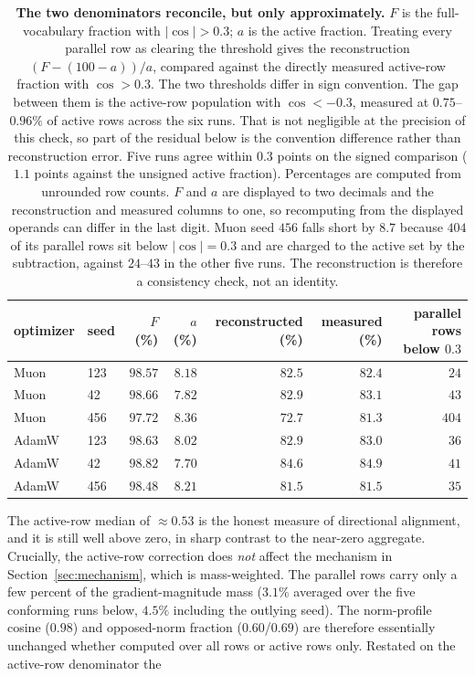 \begin{table}[t]
\centering
\small
\begin{tabular}{llrrrrr}
\toprule
optimizer & seed & $F$ (\%) & $a$ (\%) & reconstructed (\%) & measured (\%) & parallel rows below $0.3$ \\
\midrule
Muon & 123 & $98.57$ & $8.18$ & $82.5$ & $82.4$ & $24$ \\
Muon & 42 & $98.66$ & $7.82$ & $82.9$ & $83.1$ & $43$ \\
Muon & 456 & $97.72$ & $8.36$ & $72.7$ & $81.3$ & $404$ \\
AdamW & 123 & $98.63$ & $8.02$ & $82.9$ & $83.0$ & $36$ \\
AdamW & 42 & $98.82$ & $7.70$ & $84.6$ & $84.9$ & $41$ \\
AdamW & 456 & $98.48$ & $8.21$ & $81.5$ & $81.5$ & $35$ \\
\bottomrule
\end{tabular}
\caption{\textbf{The two denominators reconcile, but only approximately.} $F$ is the
full-vocabulary fraction with $|\cos|>0.3$; $a$ is the active fraction. Treating every
parallel row as clearing the threshold gives the reconstruction
$(F-(100-a))/a$, compared against the directly measured active-row fraction with
$\cos>0.3$. The two thresholds differ in sign convention. The gap
between them is the active-row population with $\cos<-0.3$, measured at
$0.75$--$0.96\%$ of active rows across the six runs. That is not negligible at
the precision of this check, so part of the residual below is the convention
difference rather than reconstruction error. Five runs agree within $0.3$ points on the
signed comparison ($1.1$ points against the unsigned active fraction).
Percentages are computed from unrounded row counts. $F$ and $a$ are
displayed to two decimals and the reconstruction and measured columns to one,
so recomputing from the displayed operands can differ in the last digit. Muon seed $456$ falls short by
$8.7$ because $404$ of its parallel rows sit below $|\cos|=0.3$ and are charged to
the active set by the subtraction, against $24$--$43$ in the other five runs. The
reconstruction is therefore a consistency check, not an identity.}
\label{tab:denominators}
\end{table}
 The active-row median of ${\approx}0.53$ is the honest measure
of directional alignment, and it is still well above zero, in sharp contrast to the
near-zero aggregate. Crucially, the active-row correction does \emph{not} affect the mechanism in Section~\ref{sec:mechanism}, which is mass-weighted. The parallel rows carry only a few percent of the gradient-magnitude mass ($3.1\%$ averaged over the five conforming runs below, $4.5\%$ including the outlying seed). The norm-profile cosine ($0.98$) and opposed-norm fraction ($0.60$/$0.69$) are therefore essentially unchanged whether computed over all rows or active rows only. Restated on the active-row denominator the
